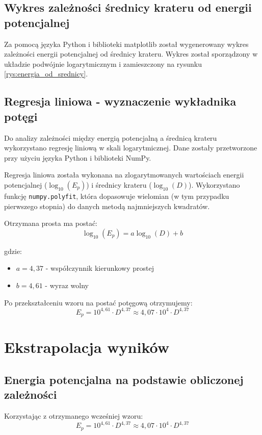 \documentclass[a4paper,12pt]{article}
\begin{document}
\subsection{Wykres zależności średnicy krateru od energii potencjalnej}

Za pomocą języka Python i biblioteki matplotlib został wygenerowany wykres zależności energii potencjalnej od średnicy krateru. Wykres został sporządzony w układzie podwójnie logarytmicznym i zamieszczony na rysunku \ref{rys:energia_od_srednicy}.

\subsection{Regresja liniowa - wyznaczenie wykładnika potęgi}

Do analizy zależności między energią potencjalną a średnicą krateru wykorzystano regresję liniową w skali logarytmicznej. Dane zostały przetworzone przy użyciu języka Python i biblioteki NumPy.

Regresja liniowa została wykonana na zlogarytmowanych wartościach energii potencjalnej ($\log_{10}(E_p)$) i średnicy krateru ($\log_{10}(D)$). Wykorzystano funkcję \texttt{numpy.polyfit}, która dopasowuje wielomian (w tym przypadku pierwszego stopnia) do danych metodą najmniejszych kwadratów.


Otrzymana prosta ma postać:
\[ \log_{10}(E_p) = a\log_{10}(D) + b \]

gdzie:
\begin{itemize}
    \item $a = 4,37$ - współczynnik kierunkowy prostej
    \item $b = 4,61$ - wyraz wolny
\end{itemize}

Po przekształceniu wzoru na postać potęgową otrzymujemy:
\[ E_p = 10^{4,61} \cdot D^{4,37} \approx 4,07 \cdot 10^4 \cdot D^{4,37} \]
\section{Ekstrapolacja wyników}

\subsection{Energia potencjalna na podstawie obliczonej zależności}

Korzystając z otrzymanego wcześniej wzoru:
\[
    E_p = 10^{4,61} \cdot D^{4,37} \approx 4,07 \cdot 10^4 \cdot D^{4,37}
\]
\end{document}
